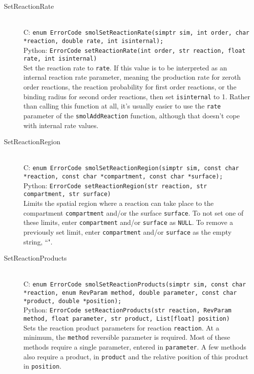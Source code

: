 \documentclass {book}
\begin{document}
\begin{description}
\item[SetReactionRate]
\hfill \\
C: \texttt{enum ErrorCode smolSetReactionRate(simptr sim, int order, char *reaction, double rate, int isinternal);}\\
Python: \texttt{ErrorCode setReactionRate(int order, str reaction, float rate, int isinternal)}\\
Set the reaction rate to \texttt{rate}. If this value is to be interpreted as an internal reaction rate parameter, meaning the production rate for zeroth order reactions, the reaction probability for first order reactions, or the binding radius for second order reactions, then set \texttt{isinternal} to 1. Rather than calling this function at all, it's usually easier to use the \texttt{rate} parameter of the \texttt{smolAddReaction} function, although that doesn't cope with internal rate values.

\item[SetReactionRegion]
\hfill \\
C: \texttt{enum ErrorCode smolSetReactionRegion(simptr sim, const char *reaction, const char *compartment, const char *surface);}\\
Python: \texttt{ErrorCode setReactionRegion(str reaction, str compartment, str surface)}\\
Limits the spatial region where a reaction can take place to the compartment \texttt{compartment} and/or the surface \texttt{surface}. To not set one of these limits, enter \texttt{compartment} and/or \texttt{surface} as \texttt{NULL}. To remove a previously set limit, enter \texttt{compartment} and/or \texttt{surface} as the empty string, ``".

\item[SetReactionProducts]
\hfill \\
C: \texttt{enum ErrorCode smolSetReactionProducts(simptr sim, const char *reaction, enum RevParam method, double parameter, const char *product, double *position);}\\
Python: \texttt{ErrorCode setReactionProducts(str reaction, RevParam method, float parameter, str product, List[float] position)}\\
Sets the reaction product parameters for reaction \texttt{reaction}. At a minimum, the \texttt{method} reversible parameter is required. Most of these methods require a single parameter, entered in \texttt{parameter}. A few methods also require a product, in \texttt{product} and the relative position of this product in \texttt{position}.


\end{description}
\end{document}
